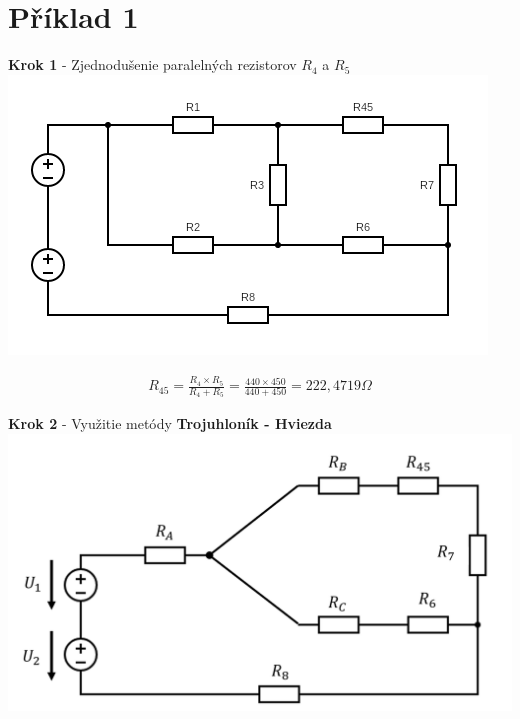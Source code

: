 \section{Příklad 1}

\begin{center}
	\textbf{Krok 1} - Zjednodušenie paralelných rezistorov $R_4$ a $R_5$
	\includegraphics[scale=0.6,keepaspectratio]{fig/c1.png} \\
\end{center}

\begin{gather*}
	R_{45} = \frac{R_4 \times R_5}{R_4 + R_5} = \frac{440 \times 450}{440 + 450} = 222,4719 \Omega
\end{gather*}

\newpage

\begin{center}
\textbf{Krok 2} - Využitie metódy \textbf{Trojuhloník - Hviezda}
\includegraphics[scale=0.6,keepaspectratio]{fig/c2.png} \\
\end{center}

